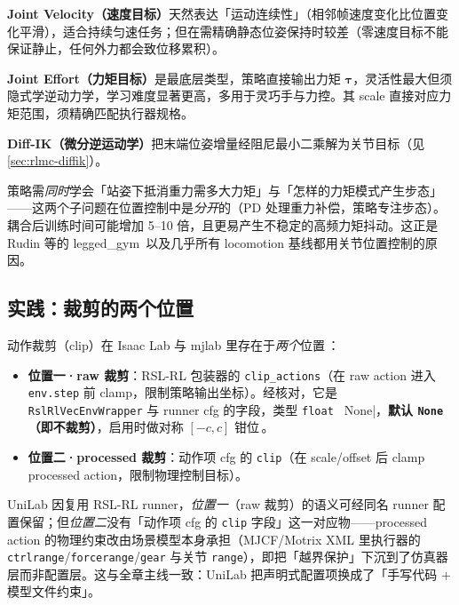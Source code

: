 \textbf{Joint Velocity（速度目标）}天然表达「运动连续性」（相邻帧速度变化比位置变化平滑），适合持续匀速任务；但在需精确静态位姿保持时较差（零速度目标不能保证静止，任何外力都会致位移累积）。

\textbf{Joint Effort（力矩目标）}是最底层类型，策略直接输出力矩 $\boldsymbol\tau$，灵活性最大但须隐式学逆动力学，学习难度显著更高，多用于灵巧手与力控。其 scale 直接对应力矩范围，须精确匹配执行器规格。

\textbf{Diff-IK（微分逆运动学）}把末端位姿增量经阻尼最小二乘解为关节目标（见 \cref{sec:rlmc-diffik}）。

\begin{insight}\label{ins:rlmc-counterfactual}
策略需\emph{同时}学会「站姿下抵消重力需多大力矩」与「怎样的力矩模式产生步态」——这两个子问题在位置控制中是\emph{分开}的（PD 处理重力补偿，策略专注步态）。耦合后训练时间可能增加 5--10 倍，且更易产生不稳定的高频力矩抖动。这正是 Rudin 等的 legged\_gym\,\cite{rudin2021minutes} 以及几乎所有 locomotion 基线都用关节位置控制的原因。
\end{insight}

\subsection{实践：裁剪的两个位置}
\label{sec:rlmc-clip}

动作裁剪（clip）在 Isaac Lab 与 mjlab 里存在于\emph{两个}位置\,\cite{isaaclab2024}：
\begin{itemize}
  \item \textbf{位置一·raw 裁剪}：RSL-RL 包装器的 \verb|clip_actions|（在 raw action 进入 \verb|env.step| 前 clamp，限制策略输出坐标）。经核对，它是 \verb|RslRlVecEnvWrapper| 与 runner cfg 的字段，类型 \verb|float | None|，\textbf{默认 \texttt{None}（即不裁剪）}，启用时做对称 $[-c,c]$ 钳位\,\cite{isaaclab2024}。
  \item \textbf{位置二·processed 裁剪}：动作项 cfg 的 \verb|clip|（在 scale/offset 后 clamp processed action，限制物理控制目标）。
\end{itemize}
UniLab 因复用 RSL-RL runner，\emph{位置一}（raw 裁剪）的语义可经同名 runner 配置保留；但\emph{位置二}没有「动作项 cfg 的 \verb|clip| 字段」这一对应物——processed action 的物理约束改由场景模型本身承担（MJCF/Motrix XML 里执行器的 \verb|ctrlrange|/\verb|forcerange|/\verb|gear| 与关节 \verb|range|），即把「越界保护」下沉到了仿真器层而非配置层。这与全章主线一致：UniLab 把声明式配置项换成了「手写代码 + 模型文件约束」。

